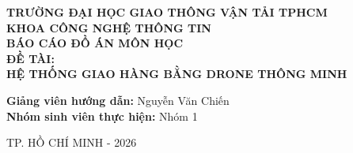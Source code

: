 \documentclass[12pt,a4paper]{report}
\begin{document}
\begin{titlepage}
    \centering
    \vspace*{1cm}
    \Large\textbf{TRƯỜNG ĐẠI HỌC GIAO THÔNG VẬN TẢI TPHCM}\\[0.5cm]
    \textbf{KHOA CÔNG NGHỆ THÔNG TIN}\\[2cm]
    
    \Large\textbf{BÁO CÁO ĐỒ ÁN MÔN HỌC}\\[0.5cm]
    \Large\textbf{ĐỀ TÀI:}\\
    \huge\textbf{HỆ THỐNG GIAO HÀNG BẰNG DRONE THÔNG MINH}\\[2cm]
    
    \Large
    \begin{flushright}
        \textbf{Giảng viên hướng dẫn:} Nguyễn Văn Chiến \\
        \textbf{Nhóm sinh viên thực hiện:} Nhóm 1\\
    \end{flushright}
    
    \vfill
    \Large TP. HỒ CHÍ MINH - 2026
\end{titlepage}

\tableofcontents
\clearpage






\end{document}
